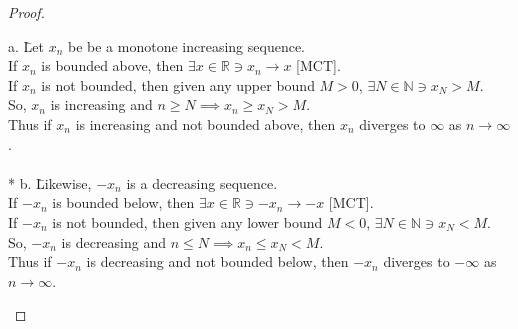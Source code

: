 \documentclass[a4paper]{article}
\newcommand{\real}{\mathbb{R}}
\newcommand{\nat}{\mathbb{N}}
\begin{document}
\begin{flushleft}
\begin{proof}
            \begin{tabbing}
                a. \= Let {$x_n$} be be a monotone increasing sequence. \\
                   \> If {$x_n$} is bounded above, then $\exists x \in \real \ni x_n \to x$ [MCT]. \\
                   \> If {$x_n$} is not bounded, then given any upper bound $M > 0$, $\exists N \in \nat \ni x_N > M$. \\
                   \> So, {$x_n$} is increasing and $n \geq N \implies x_n \geq x_N > M$. \\
                   \> Thus if {$x_n$} is increasing and not bounded above, then {$x_n$} diverges to $\infty$ as $n \to \infty$. \\
                          \mbox{}\\*
                b. \= Likewise, $-${$x_n$} is a decreasing sequence. \\
                   \> If $-${$x_n$} is bounded below, then $\exists x \in \real \ni -x_n \to -x$ [MCT]. \\
                   \> If $-${$x_n$} is not bounded, then given any lower bound $M < 0$, $\exists N \in \nat \ni x_N < M$. \\
                   \> So, $-${$x_n$} is decreasing and $n \leq N \implies x_n \leq x_N < M$. \\
                   \> Thus if $-${$x_n$} is decreasing and not bounded below, then $-${$x_n$} diverges to $-\infty$ as $n \to \infty$.
            \end{tabbing}
            
        \end{proof}

    \end{flushleft}
\end{document}
